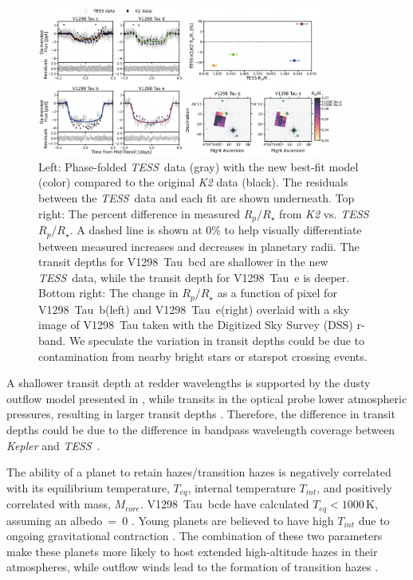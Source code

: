 \documentclass[twocolumn]{aastex631}
\newcommand{\githubicon}{{\color{black}\faGithub}}
\newcommand{\tess}{\textit{TESS}}
\newcommand{\sname}{V1298~Tau\xspace}
\newcommand{\allplanets}{V1298~Tau~bcde\xspace}
\newcommand{\planetb}{V1298~Tau~b\xspace}
\newcommand{\planete}{V1298~Tau~e\xspace}
\newcommand{\planetknown}{V1298~Tau~bcd\xspace}
\begin{document}
\begin{figure}[!htb]
\begin{center}
\includegraphics[width=0.9\textwidth,trim={0.25cm 0 0 0}]{static/compare_together.pdf}
\caption{Left: Phase-folded \tess\ data (gray) with the new best-fit model (color) compared to the original \textit{K2} data (black). The residuals between the \tess\ data and each fit are shown underneath. Top right: The percent difference in measured $R_p/R_\star$ from \textit{K2} vs. \tess\ $R_p/R_\star$. A dashed line is shown at 0\% to help visually differentiate between measured increases and decreases in planetary radii. The transit depths for \planetknown are shallower in the new \tess\ data, while the transit depth for \planete is deeper. Bottom right: The change in $R_p/R_\star$ as a function of pixel for \planetb (left) and \planete (right) overlaid with a sky image of \sname taken with the Digitized Sky Survey (DSS) r-band. We speculate the variation in transit depths could be due to contamination from nearby bright stars or starspot crossing events. \href{https://github.com/afeinstein20/v1298tau_tess/blob/main/src/figures/dilution_check.py}{\githubicon}} \label{fig:compare}
\end{center}
\end{figure}

A shallower transit depth at redder wavelengths is supported by the dusty outflow model presented in \cite{wang19}, while transits in the optical probe lower atmospheric pressures, resulting in larger transit depths \citep{gao20}. Therefore, the difference in transit depths could be due to the difference in bandpass wavelength coverage between \textit{Kepler} \citep[400-900~nm;][]{Howell2014} and \tess\ \citep[600-1000~nm;][]{Ricker2015}. 

The ability of a planet to retain hazes/transition hazes is negatively correlated with its equilibrium temperature, $T_{eq}$, internal temperature $T_{int}$, and positively correlated with mass, $M_{core}$. \allplanets have calculated $T_{eq} < 1000$\,K, assuming an albedo~=~0 \citep{David2019a}. Young planets are believed to have high $T_{int}$ due to ongoing gravitational contraction \citep{gu04}. The combination of these two parameters make these planets more likely to host extended high-altitude hazes in their atmospheres, while outflow winds lead to the formation of transition hazes \citep{gao20}. 
\end{document}
